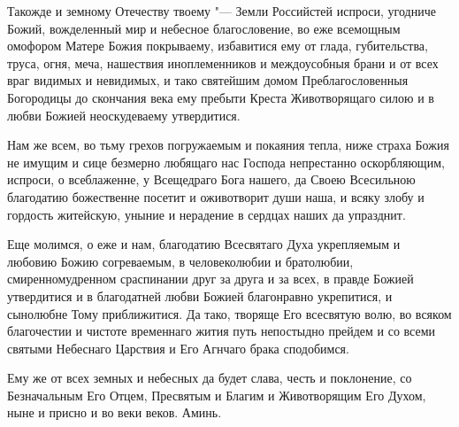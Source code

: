 \begin{mymulticols}
Такожде и земному Отечеству твоему "--- Земли Российстей испроси, угодниче Божий, вожделенный мир и небесное благословение, во еже всемощным омофором Матере Божия покрываему, избавитися ему от глада, губительства, труса, огня, меча, нашествия иноплеменников и междоусобныя брани и от всех враг видимых и невидимых, и тако святейшим домом Преблагословенныя Богородицы до скончания века ему пребыти Креста Животворящаго силою и в любви Божией неоскудеваему утвердитися.


Нам же всем, во тьму грехов погружаемым и покаяния тепла, ниже страха Божия не имущим и сице безмерно любящаго нас Господа непрестанно оскорбляющим, испроси, о всеблаженне, у Всещедраго Бога нашего, да Своею Всесильною благодатию божественне посетит и оживотворит души наша, и всяку злобу и гордость житейскую, уныние и нерадение в сердцах наших да упразднит.


Еще молимся, о еже и нам, благодатию Всесвятаго Духа укрепляемым и любовию Божию согреваемым, в человеколюбии и братолюбии, смиренномудренном сраспинании друг за друга и за всех, в правде Божией утвердитися и в благодатней любви Божией благонравно укрепитися, и сынолюбне Тому приближитися. Да тако, творяще Его всесвятую волю, во всяком благочестии и чистоте временнаго жития путь непостыдно прейдем и со всеми святыми Небеснаго Царствия и Его Агнчаго брака сподобимся.


Ему же от всех земных и небесных да будет слава, честь и поклонение, со Безначальным Его Отцем, Пресвятым и Благим и Животворящим Его Духом, ныне и присно и во веки веков. Аминь.

\end{mymulticols}

\mychapterending


